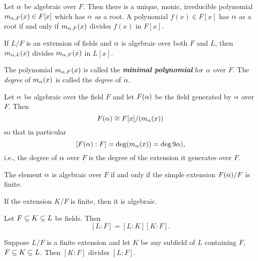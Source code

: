 \nl

\begin{prop}
Let $\alpha$ be algebraic over $F$. Then there is a unique, monic, irreducible polynomial $m_{\alpha,F}(x)\in F[x]$ which has $\alpha$ as a root. A polynomial $f(x)\in F[x]$ has $\alpha$ as a root if and only if $m_{\alpha, F}(x)$ divides $f(x)$ in $F[x]$. 
\end{prop}

\nl

\begin{cor}
If $L/F$ is an extension of fields and $\alpha$ is algebraic over both $F$ and $L$, then $m_{\alpha,L}(x)$ divides $m_{\alpha,F}(x)$ in $L[x]$.
\end{cor}

\nl

\begin{defn}
The polynomial $m_{\alpha, F}(x)$ is called the \textit{\textbf{minimal polynomial}} for $\alpha$ over $F$. The \textit{degree} of $m_\alpha(x)$ is called the \textit{degree} of $\alpha$.
\end{defn}

\nl

\begin{prop}
Let $\alpha$ be algebraic over the field $F$ and let $F(\alpha)$ be the field generated by $\alpha$ over $F$. Then
\[F(\alpha) \cong F[x]/(m_\alpha(x))\]
so that in particular
\[[F(\alpha):F] = \deg(m_\alpha(x)) = \deg9\alpha),\]
i.e., the degree of $\alpha$ over $F$ is the degree of the extension it generates over $F$.
\end{prop}

\nl

\begin{prop}
The element $\alpha$ is algebraic over $F$ if and only if the simple extension $F(\alpha)/F$ is finite.
\end{prop}

\nl

\begin{cor}
If the extension $K/F$ is finite, then it is algebraic.
\end{cor}

\nl

\begin{thm}
Let $F\subseteq K\subseteq L$ be fields. Then 
\[[L:F] = [L:K][K:F].\]
\end{thm}

\nl

\begin{cor}
Suppose $L/F$ is a finite extension and let $K$ be any subfield of $L$ containing $F$, $F\subseteq K\subseteq L$. Then $[K:F]$ divides $[L:F]$.
\end{cor}

